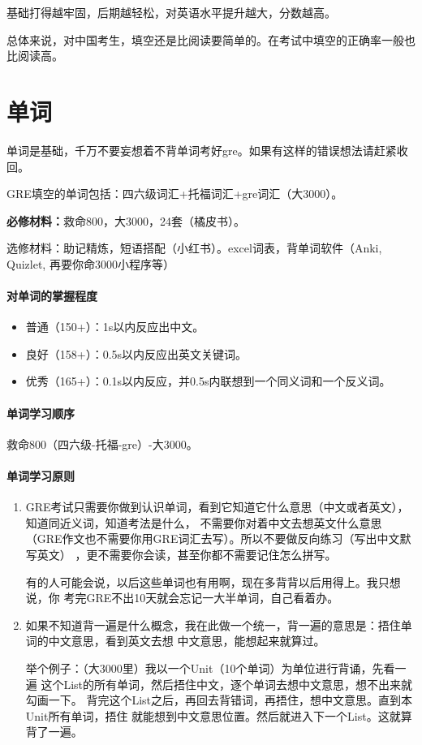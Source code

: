 \documentclass[cn,plain]{elegantbookex}
\newenvironment{material}{\begin{tcolorbox}[title={材料}]}{\end{tcolorbox}}
\begin{document}
基础打得越牢固，后期越轻松，对英语水平提升越大，分数越高。

总体来说，对中国考生，填空还是比阅读要简单的。在考试中填空的正确率一般也比阅读高。

\section{单词}
单词是基础，千万不要妄想着不背单词考好gre。如果有这样的错误想法请赶紧收回。

GRE填空的单词包括：四六级词汇+托福词汇+gre词汇（大3000）。

\begin{material}
\textbf{必修材料：}救命800，大3000，24套（橘皮书）。

选修材料：助记精炼，短语搭配（小红书）。excel词表，背单词软件（Anki,
Quizlet, 再要你命3000小程序等）
\end{material}

\paragraph{对单词的掌握程度}
\begin{itemize}
\item 普通（150+）：1s以内反应出中文。
\item 良好（158+）：0.5s以内反应出英文关键词。
\item 优秀（165+）：0.1s以内反应，并0.5s内联想到一个同义词和一个反义词。
\end{itemize}

\paragraph{单词学习顺序}
救命800（四六级-托福-gre）-大3000。

\paragraph{单词学习原则}
\begin{enumerate}
\item GRE考试只需要你做到认识单词，看到它知道它什么意思（中文或者英文），知道同近义词，知道考法是什么，
不需要你对着中文去想英文什么意思（GRE作文也不需要你用GRE词汇去写）。所以不要做反向练习（写出中文默写英文）
，更不需要你会读，甚至你都不需要记住怎么拼写。

有的人可能会说，以后这些单词也有用啊，现在多背背以后用得上。我只想说，你
考完GRE不出10天就会忘记一大半单词，自己看着办。

\item 如果不知道背一遍是什么概念，我在此做一个统一，背一遍的意思是：捂住单词的中文意思，看到英文去想
中文意思，能想起来就算过。

举个例子：（大3000里）我以一个Unit（10个单词）为单位进行背诵，先看一遍
这个List的所有单词，然后捂住中文，逐个单词去想中文意思，想不出来就勾画一下。
背完这个List之后，再回去背错词，再捂住，想中文意思。直到本Unit所有单词，捂住
就能想到中文意思位置。然后就进入下一个List。这就算背了一遍。
\end{enumerate}
\end{document}
